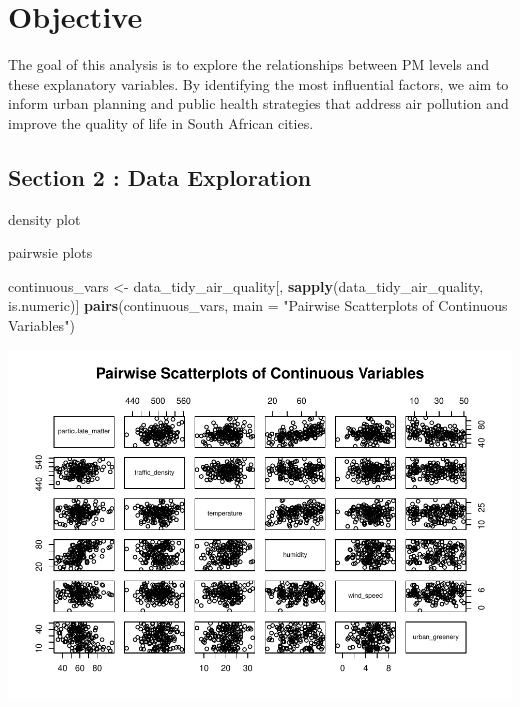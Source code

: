 \documentclass[12pt,halfline,a4paper,]{ouparticle}
\newenvironment{Shaded}{\begin{snugshade}}{\end{snugshade}}
\newcommand{\AttributeTok}[1]{\textcolor[rgb]{0.13,0.29,0.53}{#1}}
\newcommand{\FunctionTok}[1]{\textcolor[rgb]{0.13,0.29,0.53}{\textbf{#1}}}
\newcommand{\NormalTok}[1]{#1}
\newcommand{\OtherTok}[1]{\textcolor[rgb]{0.56,0.35,0.01}{#1}}
\newcommand{\StringTok}[1]{\textcolor[rgb]{0.31,0.60,0.02}{#1}}
\begin{document}
\hypertarget{objective}{%
\section{Objective}\label{objective}}

\hfill\break
The goal of this analysis is to explore the relationships between PM
levels and these explanatory variables. By identifying the most
influential factors, we aim to inform urban planning and public health
strategies that address air pollution and improve the quality of life in
South African cities.

\hypertarget{section-2-data-exploration}{%
\subsection{Section 2 : Data
Exploration}\label{section-2-data-exploration}}

density plot

pairwsie plots

\begin{Shaded}
\begin{Highlighting}[]
\NormalTok{continuous\_vars }\OtherTok{\textless{}{-}}\NormalTok{ data\_tidy\_air\_quality[, }\FunctionTok{sapply}\NormalTok{(data\_tidy\_air\_quality, is.numeric)]}
\FunctionTok{pairs}\NormalTok{(continuous\_vars, }\AttributeTok{main =} \StringTok{"Pairwise Scatterplots of Continuous Variables"}\NormalTok{)}
\end{Highlighting}
\end{Shaded}

\includegraphics{Report_files/figure-latex/unnamed-chunk-1-1.pdf}
\end{document}
